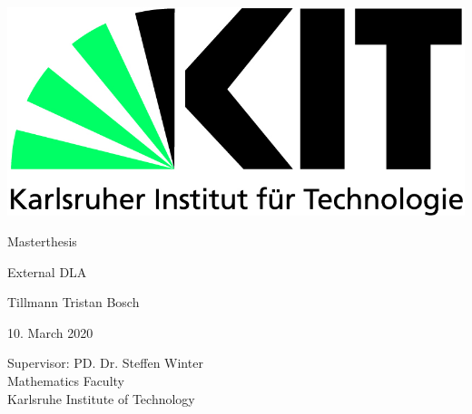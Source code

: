 \documentclass[12pt,a4paper]{scrartcl}
\numberwithin{equation}{section}
\numberwithin{equation}{section}%
\theoremstyle{definition}
\theoremstyle{definition}
\begin{document}
	\pagestyle{empty}

\begin{titlepage}

	\includegraphics[scale=0.45]{kit-logo.jpg} 
    \vspace*{2cm} 
\begin{center} \large 
    
   Masterthesis
    \vspace*{2cm}

    {\huge External DLA}\\
    \vspace*{2.5cm}

    Tillmann Tristan Bosch
    \vspace*{1.5cm}

    10. March 2020
    \vspace*{3.5cm}


    Supervisor: PD. Dr. Steffen Winter \\[1cm]
    Mathematics Faculty\\[1cm]
	Karlsruhe Institute of Technology
\end{center}
\end{titlepage}

\newpage

\newpage
\phantom \\
\newpage

\tableofcontents %

 	\pagestyle{headings}

\setcounter{page}{1}
\end{document}
